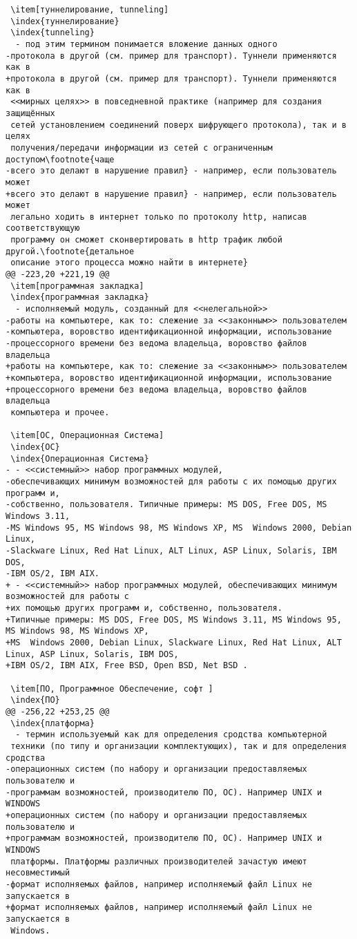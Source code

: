 \begin{verbatim}
 \item[туннелирование, tunneling]
 \index{туннелирование}
 \index{tunneling}
  - под этим термином понимается вложение данных одного
-протокола в другой (см. пример для транспорт). Туннели применяются как в
+протокола в другой (см. пример для транспорт). Туннели применяются как в
 <<мирных целях>> в повседневной практике (например для создания защищённых
 сетей установлением соединений поверх шифрующего протокола), так и в целях
 получения/передачи информации из сетей с ограниченным доступом\footnote{чаще
-всего это делают в нарушение правил} - например, если пользователь может
+всего это делают в нарушение правил} - например, если пользователь может
 легально ходить в интернет только по протоколу http, написав соответствующую
 программу он сможет сконвертировать в http трафик любой другой.\footnote{детальное
 описание этого процесса можно найти в интернете}
@@ -223,20 +221,19 @@
 \item[программная закладка]
 \index{программная закладка}
  - исполняемый модуль, созданный для <<нелегальной>>
-работы на компьютере, как то: слежение за <<законным>> пользователем
-компьютера, воровство идентификационной информации, использование
-процессорного времени без ведома владельца, воровство файлов владельца
+работы на компьютере, как то: слежение за <<законным>> пользователем
+компьютера, воровство идентификационной информации, использование
+процессорного времени без ведома владельца, воровство файлов владельца
 компьютера и прочее.

 \item[ОС, Операционная Система]
 \index{ОС}
 \index{Операционная Система}
- - <<системный>> набор программных модулей,
-обеспечивающих минимум возможностей для работы с их помощью других программ и,
-собственно, пользователя. Типичные примеры: MS DOS, Free DOS, MS Windows 3.11,
-MS Windows 95, MS Windows 98, MS Windows XP, MS  Windows 2000, Debian Linux,
-Slackware Linux, Red Hat Linux, ALT Linux, ASP Linux, Solaris, IBM DOS,
-IBM OS/2, IBM AIX.
+ - <<системный>> набор программных модулей, обеспечивающих минимум возможностей для работы с
+их помощью других программ и, собственно, пользователя.
+Типичные примеры: MS DOS, Free DOS, MS Windows 3.11, MS Windows 95, MS Windows 98, MS Windows XP,
+MS  Windows 2000, Debian Linux, Slackware Linux, Red Hat Linux, ALT Linux, ASP Linux, Solaris, IBM DOS,
+IBM OS/2, IBM AIX, Free BSD, Open BSD, Net BSD .

 \item[ПО, Программное Обеспечение, софт ]
 \index{ПО}
@@ -256,22 +253,25 @@
 \index{платформа}
  - термин используемый как для определения сродства компьютерной
 техники (по типу и организации комплектующих), так и для определения сродства
-операционных систем (по набору и организации предоставляемых пользователю и
-программам возможностей, производителю ПО, ОС). Например UNIX и WINDOWS
+операционных систем (по набору и организации предоставляемых пользователю и
+программам возможностей, производителю ПО, ОС). Например UNIX и WINDOWS
 платформы. Платформы различных производителей зачастую имеют несовместимый
-формат исполняемых файлов, например исполняемый файл Linux не запускается в
+формат исполняемых файлов, например исполняемый файл Linux не запускается в
 Windows.


\end{verbatim}
